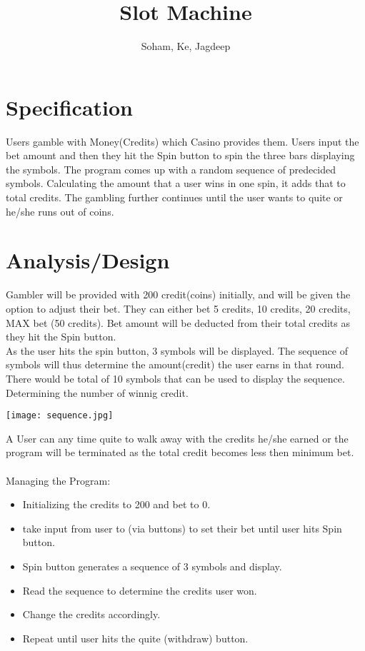 \documentclass{article}
\title{Slot Machine}
\author{Soham, Ke, Jagdeep}
\begin{document}
\maketitle

\section{Specification}
Users gamble with Money(Credits) which Casino provides them. Users input the bet amount and then they hit the Spin button to spin the three bars displaying the symbols.
The program comes up with a random sequence of predecided symbols.
Calculating the amount that a user wins in one spin, it adds that to total credits.
The gambling further continues until the user wants to quite or he/she runs out of coins.




\section{Analysis/Design}
Gambler will be provided with 200 credit(coins) initially, and will be given the option to adjust their bet. They can either bet 5 credits, 10 credits, 20 credits, MAX bet (50 credits). Bet amount will be deducted from their total credits as they hit the Spin button.\\

As the user hits the spin button, 3 symbols will be displayed. The sequence of symbols will thus determine the amount(credit) the user earns in that round. \\

There would be total of 10 symbols that can be used to display the sequence.\\

Determining the number of winnig credit.

\texttt{[image: sequence.jpg]}

A User can any time quite to walk away with the credits he/she earned or the program will be terminated as the total credit becomes less then minimum bet.\\ \\

Managing the Program:
\begin{itemize}
\item Initializing the credits to 200 and bet to 0.
\item take input from user to (via buttons) to set their bet until user hits Spin button.
\item Spin button generates a sequence of 3 symbols and display.
\item Read the sequence to determine the credits user won.
\item Change the credits accordingly.
\item Repeat until user hits the quite (withdraw) button.
\end{itemize}
\end{document}
